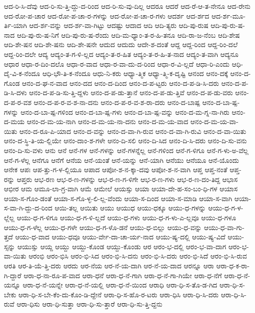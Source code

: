 {ಆದ-ರಿ-ಸಿ-ದೆವು
ಆದ-ರಿ-ಸು-ತ್ತಿ-ದ್ದು-ದ-ರಿಂದ
ಆದ-ರಿ-ಸು-ವು-ದಿಲ್ಲ
ಆದರೂ
ಆದರೆ
ಆದ-ರೆ-ಆ-ತ-ನೇನೂ
ಆದ-ರೇನು
ಆದ-ರೋ-ಪ-ಚಾರ
ಆದ-ರೋ-ಪ-ಚಾ-ರ-ಗಳನ್ನು
ಆದ-ರೋ-ಪ-ಚಾ-ರ-ಗಳು
ಆದರ್ಶ
ಆದ-ರ್ಶದ
ಆದ-ರ್ಶ-ಮೂ-ರ್ತಿ-ಯಾಗಿ
ಆದ-ರ್ಶ-ವನ್ನು
ಆದ-ರ್ಶ-ವಾ-ಗಿಟ್ಟು
ಆದಷ್ಟು
ಆದಾದ
ಆದಿ
ಆದಿ-ತ್ಯರು
ಆದಿ-ಪು-ರುಷ
ಆದಿ-ಪು-ರು-ಷ-ನಾದ
ಆದಿ-ಪು-ರು-ಷ-ನಿಗೆ
ಆದಿ-ಪು-ರು-ಷ-ರೆಂದು
ಆದಿ-ಮ-ಧ್ಯಾಂ-ತ-ರ-ಹಿ-ತನೂ
ಆದಿ-ರಾ-ಜ-ನೆಂಬ
ಆದಿ-ಶೇಷ
ಆದಿ-ಶೇ-ಷನ
ಆದಿ-ಶೇ-ಷನು
ಆದಿ-ಶೇ-ಷನೇ
ಆದುದ
ಆದುದು
ಆದೇ-ಶ-ದಂತೆ
ಆದ್ದ
ಆದ್ದ-ರಿಂದ
ಆದ್ದ-ರಿಂ-ದಲೆ
ಆದ್ದ-ರಿಂ-ದಲೇ
ಆದ್ಯ
ಆದ್ಯಂ-ತ-ಗ-ಳಿ-ಲ್ಲದ
ಆದ್ಯಂ-ತ-ರ-ಹಿತ
ಆದ್ಯಂ-ತ-ರ-ಹಿ-ತ-ನಾದ
ಆದ್ಯಂ-ತ-ವಾಗಿ
ಆದ್ಯನೂ
ಆಧಾರ
ಆಧಾ-ರ-ದಿಂ-ದಲೊ
ಆಧಾ-ರ-ವಾದ
ಆಧಾ-ರ-ವಾ-ದು-ದ-ರಿಂದ
ಆಧಾ-ರ-ವಿ-ಲ್ಲದೆ
ಆಧಾ-ರಿ-ಎಂದು
ಆಧಿ-ದೈ-ವಿ-ಕ-ನೆಂದೂ
ಆಧಿ-ಭೌ-ತಿ-ಕ-ನೆಂದೂ
ಆಧು-ನಿ-ಕರು
ಆಧ್ಯಾ-ತ್ಮಿಕ
ಆಧ್ಯಾ-ತ್ಮಿ-ಕ-ದೃಷ್ಟಿ
ಆನಂದ
ಆನಂ-ದಕ್ಕೆ
ಆನಂ-ದ-ಗೊಂಡ
ಆನಂ-ದ-ಘ-ನ-ವಾದ
ಆನಂ-ದದ
ಆನಂ-ದ-ದಿಂದ
ಆನಂ-ದ-ಪ-ಟ್ಟರು
ಆನಂ-ದ-ಪ-ಡಿ-ಸಿ-ದರು
ಆನಂ-ದ-ಪ-ಡಿ-ಸಿ-ದಳು
ಆನಂ-ದ-ಪ-ಡಿ-ಸು-ತ್ತಿ-ದ್ದಳು
ಆನಂ-ದ-ಪ-ಡು-ತ್ತಾನೆ
ಆನಂ-ದ-ಪ-ಡು-ತ್ತಿವೆ
ಆನಂ-ದ-ಪ-ಡು-ವರು
ಆನಂ-ದ-ಪ-ರ-ವಶ
ಆನಂ-ದ-ಪ-ರ-ವ-ಶ-ನಾ-ದನು
ಆನಂ-ದ-ಪ-ರ-ವ-ಶ-ರಾ-ದರು
ಆನಂ-ದ-ಬಾಷ್ಪ
ಆನಂ-ದ-ಬಾ-ಷ್ಪ-ಗಳನ್ನು
ಆನಂ-ದ-ಬಾ-ಷ್ಪ-ಗಳಿಂದ
ಆನಂ-ದ-ಬಾ-ಷ್ಪ-ಗಳು
ಆನಂ-ದ-ಬಾ-ಷ್ಪ-ವನ್ನು
ಆನಂ-ದ-ಮ-ಗ್ನ-ನಾ-ಗಿರು
ಆನಂ-ದ-ಮಯ
ಆನಂ-ದ-ಮ-ಯ-ನಾಗಿ
ಆನಂ-ದ-ಮ-ಯ-ನಾ-ದನು
ಆನಂ-ದ-ಮ-ಯ-ವಾದ
ಆನಂ-ದ-ಮ-ಯ-ವಾ-ಯಿತು
ಆನಂ-ದ-ರೂ-ಪಿ-ಯಾದ
ಆನಂ-ದ-ವನ್ನು
ಆನಂ-ದ-ವಾ-ಗಿ-ರುವ
ಆನಂ-ದ-ವಾ-ಗಿ-ರುವಿ
ಆನಂ-ದ-ವಾ-ಯಿತು
ಆನಂ-ದ-ಸ್ಥಿ-ತಿ-ಯ-ಲ್ಲಿಯೇ
ಆನಂ-ದಾಂ-ಶ-ಗಳೇ
ಆನಂ-ದಿ-ಸಲಿ
ಆನಂ-ದಿ-ಸಿದ
ಆನಂ-ದಿ-ಸಿ-ದರು
ಆನಂ-ದಿ-ಸು-ವನು
ಆನಂ-ದಿ-ಸು-ವಳು
ಆನು
ಆನೆ
ಆನೆ-ಗಳ
ಆನೆ-ಗಳನ್ನು
ಆನೆ-ಗಳನ್ನೆಲ್ಲ
ಆನೆ-ಗಳಿಂದ
ಆನೆ-ಗ-ಳಿಗೂ
ಆನೆ-ಗ-ಳು-ಅ-ವೆಲ್ಲ
ಆನೆ-ಗ-ಳೆಲ್ಲ
ಆನೆಗೂ
ಆನೆಗೆ
ಆನೆಯ
ಆನೆ-ಯಂತೆ
ಆನೆ-ಯನ್ನು
ಆನೆ-ಯಾಗಿ
ಆನೆಯು
ಆನೆಯೂ
ಆನೆ-ಯೊಂದು
ಆನೇಕ
ಆಪಃ
ಆಪ-ತ್ತು-ಗ-ಳ-ಲ್ಲಿಯೂ
ಆಪಾದ
ಆಪೋ-ಶ-ನ-ಕ್ಕಾ-ದವು
ಆಪೋ-ಶ-ನ-ವಾಗಿ
ಆಪ್ತ
ಆಪ್ತ-ನಂತೆ
ಆಪ್ತ-ರನ್ನು
ಆಪ್ತರು
ಆಭ-ರಣ
ಆಭ-ರ-ಣ-ಗಳನ್ನು
ಆಭ-ರ-ಣ-ಗ-ಳಿಗೇ
ಆಭ-ರ-ಣ-ಗಳು
ಆಭ-ರ-ಣ-ದಂ-ತಿದ್ದ
ಆಭಾಸ
ಆಭೀರ
ಆಮ
ಆಮೂ-ಲಾ-ಗ್ರ-ವಾಗಿ
ಆಮೆ
ಆಮೇಲೆ
ಆಯಸ್ಸು
ಆಯಾ
ಆಯಾ-ದೇ-ಹ-ಸಂ-ಬಂ-ಧಿ-ಗಳ
ಆಯಾಸ
ಆಯಾ-ಸ-ಗೊಂ-ಡಂತೆ
ಆಯಾ-ಸ-ಗೊ-ಳ್ಳ-ಲಿ-ಲ್ಲ-ವೆಂದು
ಆಯಾ-ಸ-ದಿಂದ
ಆಯಾ-ಸ-ಮಾಡಿ
ಆಯಾ-ಸ-ವಾಗಿ
ಆಯಾ-ಸ-ವಾ-ಗಿ-ದ್ದು-ದ-ರಿಂದ
ಆಯಿ-ತಲ್ಲ
ಆಯಿತು
ಆಯು
ಆಯುಧ
ಆಯು-ಧಕ್ಕೂ
ಆಯು-ಧ-ಗಳನ್ನು
ಆಯು-ಧ-ಗ-ಳ-ಲ್ಲೆಲ್ಲ
ಆಯು-ಧ-ಗ-ಳಿಗೂ
ಆಯು-ಧ-ಗ-ಳಿ-ಲ್ಲದೆ
ಆಯು-ಧ-ಗಳು
ಆಯು-ಧ-ಗ-ಳು-ಎ-ಲ್ಲವೂ
ಆಯು-ಧ-ಗಳೂ
ಆಯು-ಧ-ಗ-ಳೆಲ್ಲ
ಆಯು-ಧ-ಗಳೇ
ಆಯು-ಧ-ಗ-ಳೊ-ಡನೆ
ಆಯು-ಧ-ಬಿಲ್ಲು
ಆಯು-ಧ-ವನ್ನು
ಆಯು-ಧ-ವಾ-ಗು-ತ್ತದೆ
ಆಯು-ಧ-ವಾದ
ಆಯು-ಧವೂ
ಆಯು-ರ್ವೇ-ದಾ-ಚಾ-ರ್ಯ-ನಾದ
ಆಯು-ಷ್ಯ-ದಲ್ಲಿ
ಆಯು-ಷ್ಯ-ವಿದೆ
ಆಯು-ಸ್ಸನ್ನು
ಆಯುಸ್ಸು
ಆಯ್ದ
ಆಯ್ದು
ಆಯ್ದು-ಕೊಂಡ
ಆಯ್ದು-ಕೊಂಡು
ಆರ
ಆರಂ-ಭ-ದಲ್ಲಿ
ಆರಂ-ಭ-ವಾ-ದಾಗ
ಆರಂ-ಭ-ವಾ-ಯಿತು
ಆರಂಭಿ
ಆರಂ-ಭಿಸಿ
ಆರಂ-ಭಿ-ಸಿದ
ಆರಂ-ಭಿ-ಸಿ-ದನು
ಆರಂ-ಭಿ-ಸಿ-ದರು
ಆರಂ-ಭಿ-ಸಿದೆ
ಆರಂ-ಭಿ-ಸಿ-ರುವ
ಆರತಿ
ಆರ-ತಿ-ಯೆ-ತ್ತಿ-ದರು
ಆರದು
ಆರ-ನೆಯ
ಆರ-ನೆ-ಯ-ದಾಗಿ
ಆರ-ನೆ-ಯ-ದಾದ
ಆರನ್ನೂ
ಆರಾ
ಆರಾ-ಧ-ಕ-ರಾ-ಗಿ-ದ್ದಾರೆ
ಆರಾ-ಧ-ನಾ-ರೂ-ಪ-ವಾದ
ಆರಾ-ಧನೆ
ಆರಾ-ಧ-ನೆ-ಗಾಗಿ
ಆರಾ-ಧ-ನೆ-ಗಾ-ಗಿಯೇ
ಆರಾ-ಧ-ನೆಗೆ
ಆರಾ-ಧ-ನೆ-ಯನ್ನೂ
ಆರಾ-ಧ-ನೆ-ಯನ್ನೇ
ಆರಾ-ಧ-ನೆ-ಯಲ್ಲಿ
ಆರಾ-ಧ-ನೆ-ಯಿಂದ
ಆರಾಧಿ
ಆರಾ-ಧಿ-ಸ-ತೊ-ಡ-ಗಿದ
ಆರಾ-ಧಿ-ಸ-ಬೇಕು
ಆರಾ-ಧಿ-ಸ-ಬೇ-ಕೆಂ-ದು-ಕೊಂ-ಡಿ-ದ್ದೇನೆ
ಆರಾ-ಧಿ-ಸ-ಹೊ-ರ-ಟರು
ಆರಾ-ಧಿಸಿ
ಆರಾ-ಧಿ-ಸಿ-ದರು
ಆರಾ-ಧಿ-ಸಿ-ರುವೆ
ಆರಾ-ಧಿಸು
ಆರಾ-ಧಿ-ಸುತ್ತಾ
ಆರಾ-ಧಿ-ಸು-ತ್ತಾರೆ
ಆರಾ-ಧಿ-ಸು-ತ್ತಿ-ದ್ದನು
}
